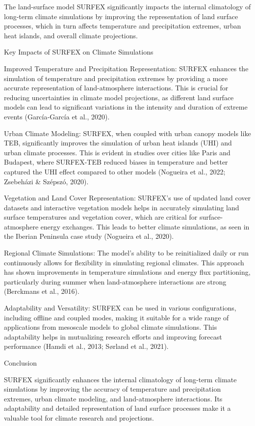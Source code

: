 The land-surface model SURFEX significantly impacts the internal climatology of long-term climate simulations by improving the representation of land surface processes, which in turn affects temperature and precipitation extremes, urban heat islands, and overall climate projections.

Key Impacts of SURFEX on Climate Simulations

Improved Temperature and Precipitation Representation: SURFEX enhances the simulation of temperature and precipitation extremes by providing a more accurate representation of land-atmosphere interactions. This is crucial for reducing uncertainties in climate model projections, as different land surface models can lead to significant variations in the intensity and duration of extreme events (García‐García et al., 2020).


Urban Climate Modeling: SURFEX, when coupled with urban canopy models like TEB, significantly improves the simulation of urban heat islands (UHI) and urban climate processes. This is evident in studies over cities like Paris and Budapest, where SURFEX-TEB reduced biases in temperature and better captured the UHI effect compared to other models (Nogueira et al., 2022; Zsebeházi & Szépszó, 2020).


Vegetation and Land Cover Representation: SURFEX's use of updated land cover datasets and interactive vegetation models helps in accurately simulating land surface temperatures and vegetation cover, which are critical for surface-atmosphere energy exchanges. This leads to better climate simulations, as seen in the Iberian Peninsula case study (Nogueira et al., 2020).


Regional Climate Simulations: The model's ability to be reinitialized daily or run continuously allows for flexibility in simulating regional climates. This approach has shown improvements in temperature simulations and energy flux partitioning, particularly during summer when land-atmosphere interactions are strong (Berckmans et al., 2016).


Adaptability and Versatility: SURFEX can be used in various configurations, including offline and coupled modes, making it suitable for a wide range of applications from mesoscale models to global climate simulations. This adaptability helps in mutualizing research efforts and improving forecast performance (Hamdi et al., 2013; Sørland et al., 2021).

Conclusion

SURFEX significantly enhances the internal climatology of long-term climate simulations by improving the accuracy of temperature and precipitation extremes, urban climate modeling, and land-atmosphere interactions. Its adaptability and detailed representation of land surface processes make it a valuable tool for climate research and projections.

